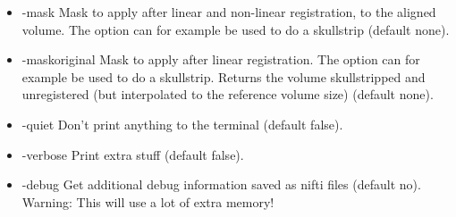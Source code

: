 \begin{itemize}

\item -mask                      
\newline \newline Mask to apply after linear and non-linear registration, to the aligned volume. The option can for example be used to do a skullstrip (default none). 

\item -maskoriginal                      
\newline \newline Mask to apply after linear registration. The option can for example be used to do a skullstrip. Returns the volume skullstripped and unregistered (but interpolated to the reference volume size) (default none). 

\item -quiet 
\newline \newline Don't print anything to the terminal (default false). 

\item -verbose
\newline \newline Print extra stuff (default false).
 
\item -debug 
\newline \newline Get additional debug information saved as nifti files (default no). Warning: This will use a lot of extra memory! 

\end{itemize}


